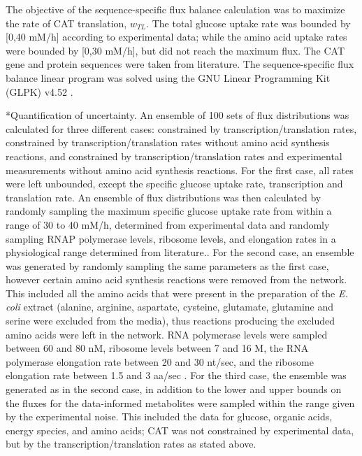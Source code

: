 \documentclass[12pt]{article}
\makeatletter
\renewcommand\subsubsection{\@startsection
	{subsubsection}{2}{0mm}
	{-0.05in}
	{-0.5\baselineskip}
	{\normalfont\normalsize\itshape}}
\makeatother
\begin{document}
The objective of the sequence-specific flux balance calculation was to maximize the rate of CAT translation, $w_{TL}$.
The total glucose uptake rate was bounded by [0,40 mM/h] according to experimental data;
while the amino acid uptake rates were bounded by [0,30 mM/h], but did not reach the maximum flux.
The CAT gene and protein sequences were taken from literature.
The sequence-specific flux balance linear program was solved using the GNU Linear Programming Kit (GLPK) v4.52 \cite{GLPK}.


\subsubsection*{Quantification of uncertainty.}
An ensemble of 100 sets of flux distributions was calculated for three different cases:  constrained by transcription/translation rates, constrained by transcription/translation rates without amino acid synthesis reactions, and constrained by transcription/translation rates and experimental measurements without amino acid synthesis reactions.
For the first case, all rates were left unbounded, except the specific glucose uptake rate, transcription and translation rate.
An ensemble of flux distributions was then calculated by randomly sampling the maximum specific glucose uptake rate from within a range of 30 to 40 mM/h, determined from experimental data and randomly sampling RNAP polymerase levels, ribosome levels, and elongation rates in a physiological range determined from literature..
For the second case, an ensemble was generated by randomly sampling the same parameters as the first case, however certain amino acid synthesis reactions were removed from the network.
This included all the amino acids that were present in the preparation of the \textit{E. coli} extract (alanine, arginine, aspartate, cysteine, glutamate, glutamine and serine were excluded from the media), thus reactions producing the excluded amino acids were left in the network. 
RNA polymerase levels were sampled between 60 and 80 nM, ribosome levels between 7 and 16 \textmu M, the RNA polymerase elongation rate between 20 and 30 nt/sec, and the ribosome elongation rate between 1.5 and 3 aa/sec \cite{2005_underwood_biotech, Garamella:2016aa}.
For the third case, the ensemble was generated as in the second case, in addition to the lower and upper bounds on the fluxes for the data-informed metabolites were sampled within the range given by the experimental noise.
This included the data for glucose, organic acids, energy species, and amino acids; CAT was not constrained by experimental data, but by the transcription/translation rates as stated above.
\end{document}
